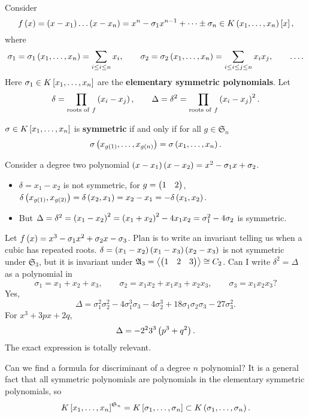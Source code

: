 
Consider
$$ f\rb{x} = \rb{x - x_1} \dots \rb{x - x_n} = x^n - \sigma_1x^{n - 1} + \dots \pm \sigma_n \in K\rb{x_1, \dots, x_n}\sb{x}, $$
where
$$ \sigma_1 = \sigma_1\rb{x_1, \dots, x_n} = \sum_{i \le i \le n} x_i, \qquad \sigma_2 = \sigma_2\rb{x_1, \dots, x_n} = \sum_{i \le i \le j \le n} x_ix_j, \qquad \dots. $$
Here $ \sigma_1 \in K\sb{x_1, \dots, x_n} $ are the \textbf{elementary symmetric polynomials}. Let
$$ \delta = \prod_{\text{roots of} \ f} \rb{x_i - x_j}, \qquad \Delta = \delta^2 = \prod_{\text{roots of} \ f} \rb{x_i - x_j}^2. $$

\begin{definition}
$ \sigma \in K\sb{x_1, \dots, x_n} $ is \textbf{symmetric} if and only if for all $ g \in \mathfrak{S}_n $
$$ \sigma\rb{x_{g\rb{1}}, \dots, x_{g\rb{n}}} = \sigma\rb{x_1, \dots, x_n}. $$
\end{definition}

\begin{example*}
Consider a degree two polynomial $ \rb{x - x_1}\rb{x - x_2} = x^2 - \sigma_1x + \sigma_2 $.
\begin{itemize}
\item $ \delta = x_1 - x_2 $ is not symmetric, for $ g = \onebytwo{1}{2} $, $ \delta\rb{x_{g\rb{1}}, x_{g\rb{2}}} = \delta\rb{x_2, x_1} = x_2 - x_1 = -\delta\rb{x_1, x_2} $.
\item But $ \Delta = \delta^2 = \rb{x_1 - x_2}^2 = \rb{x_1 + x_2}^2 - 4x_1x_2 = \sigma_1^2 - 4\sigma_2 $ is symmetric.
\end{itemize}
\end{example*}

\begin{example*}
Let $ f\rb{x} = x^3 - \sigma_1x^2 + \sigma_2x - \sigma_3 $. Plan is to write an invariant telling us when a cubic has repeated roots. $ \delta = \rb{x_1 - x_2}\rb{x_1 - x_3}\rb{x_2 - x_3} $ is not symmetric under $ \mathfrak{S}_3 $, but it is invariant under $ \mathfrak{A}_3 = \ab{\onebythree{1}{2}{3}} \cong C_2 $. Can I write $ \delta^2 = \Delta $ as a polynomial in
$$ \sigma_1 = x_1 + x_2 + x_3, \qquad \sigma_2 = x_1x_2 + x_1x_3 + x_2x_3, \qquad \sigma_3 = x_1x_2x_3? $$
Yes,
$$ \Delta = \sigma_1^2\sigma_2^2 - 4\sigma_1^3\sigma_3 - 4\sigma_2^3 + 18\sigma_1\sigma_2\sigma_3 - 27\sigma_3^2. $$
For $ x^3 + 3px + 2q $,
$$ \Delta = -2^23^3\rb{p^3 + q^2}. $$
The exact expression is totally relevant.
\end{example*}

Can we find a formula for discriminant of a degree $ n $ polynomial? It is a general fact that all symmetric polynomials are polynomials in the elementary symmetric polynomials, so
$$ K\sb{x_1, \dots, x_n}^{\mathfrak{S}_n} = K\sb{\sigma_1, \dots, \sigma_n} \subset K\rb{\sigma_1, \dots, \sigma_n}. $$

